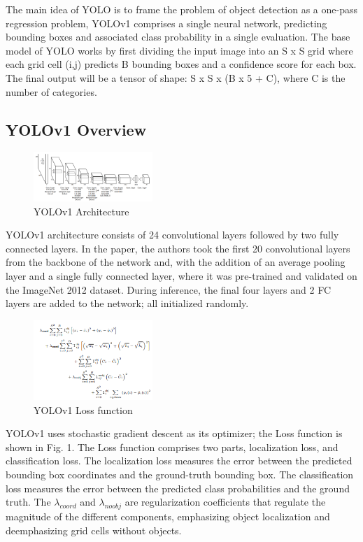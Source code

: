 \documentclass[10pt,twocolumn,letterpaper]{article}
\begin{document}
The main idea of YOLO is to frame the problem of object detection as a one-pass regression problem, YOLOv1 comprises a single neural network, predicting bounding boxes and associated class probability in a single evaluation. The base model of YOLO works by first dividing the input image into an S x S grid where each grid cell (i,j) predicts B bounding boxes and a confidence score for each box. The final output will be a tensor of shape: S x S x (B x 5 + C), where C is the number of categories.


\subsection{YOLOv1 Overview}

\begin{figure}[h]
    \centering
    \includegraphics[width=0.4\textwidth]{figures/YOLOv1 Architecture.png}
    \caption{YOLOv1 Architecture}
    \label{fig:my_label}
\end{figure}


YOLOv1 architecture consists of 24 convolutional layers followed by two fully connected layers. In the paper, the authors took the first 20 convolutional layers from the backbone of the network and, with the addition of an average pooling layer and a single fully connected layer, where it was pre-trained and validated on the ImageNet 2012 dataset. During inference, the final four layers and 2 FC layers are added to the network; all initialized randomly.


\begin{figure}[h]
    \centering
    \includegraphics[width=0.4\textwidth]{figures/YOLO_Loss.png}
    \caption{YOLOv1 Loss function}
    \label{fig:my_label}
\end{figure}

YOLOv1 uses stochastic gradient descent as its optimizer; the Loss function is shown in Fig. 1. The Loss function comprises two parts, localization loss, and classification loss. The localization loss measures the error between the predicted bounding box coordinates and the ground-truth bounding box. The classification loss measures the error between the predicted class probabilities and the ground truth. The $\lambda_{coord}$ and $\lambda_{noobj}$ are regularization coefficients that regulate the magnitude of the different components, emphasizing object localization and deemphasizing grid cells without objects.  
\end{document}
